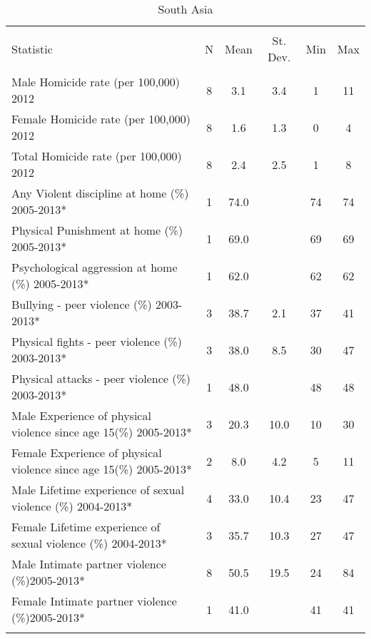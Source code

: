 
\begin{table}[!htbp] \centering 
  \caption{South Asia} 
  \label{} 
\begin{tabular}{@{\extracolsep{5pt}}lccccc} 
\\[-1.8ex]\hline 
\hline \\[-1.8ex] 
Statistic & \multicolumn{1}{c}{N} & \multicolumn{1}{c}{Mean} & \multicolumn{1}{c}{St. Dev.} & \multicolumn{1}{c}{Min} & \multicolumn{1}{c}{Max} \\ 
\hline \\[-1.8ex] 
Male Homicide rate (per 100,000) 2012 & 8 & 3.1 & 3.4 & 1 & 11 \\ 
Female Homicide rate (per 100,000)  2012 & 8 & 1.6 & 1.3 & 0 & 4 \\ 
Total Homicide rate (per 100,000)  2012 & 8 & 2.4 & 2.5 & 1 & 8 \\ 
Any Violent discipline at home (\%) 2005-2013* & 1 & 74.0 &  & 74 & 74 \\ 
Physical Punishment at home (\%) 2005-2013* & 1 & 69.0 &  & 69 & 69 \\ 
Psychological aggression at home (\%) 2005-2013* & 1 & 62.0 &  & 62 & 62 \\ 
Bullying - peer violence (\%) 2003-2013* & 3 & 38.7 & 2.1 & 37 & 41 \\ 
Physical fights - peer violence (\%) 2003-2013* & 3 & 38.0 & 8.5 & 30 & 47 \\ 
Physical attacks - peer violence (\%) 2003-2013* & 1 & 48.0 &  & 48 & 48 \\ 
Male Experience of physical violence since age 15(\%) 2005-2013* & 3 & 20.3 & 10.0 & 10 & 30 \\ 
Female Experience of physical violence since age 15(\%) 2005-2013* & 2 & 8.0 & 4.2 & 5 & 11 \\ 
Male Lifetime experience of sexual violence (\%) 2004-2013* & 4 & 33.0 & 10.4 & 23 & 47 \\ 
Female Lifetime experience of sexual violence (\%) 2004-2013* & 3 & 35.7 & 10.3 & 27 & 47 \\ 
Male Intimate partner violence (\%)2005-2013* & 8 & 50.5 & 19.5 & 24 & 84 \\ 
Female Intimate partner violence (\%)2005-2013* & 1 & 41.0 &  & 41 & 41 \\ 
\hline \\[-1.8ex] 
\end{tabular} 
\end{table} 
